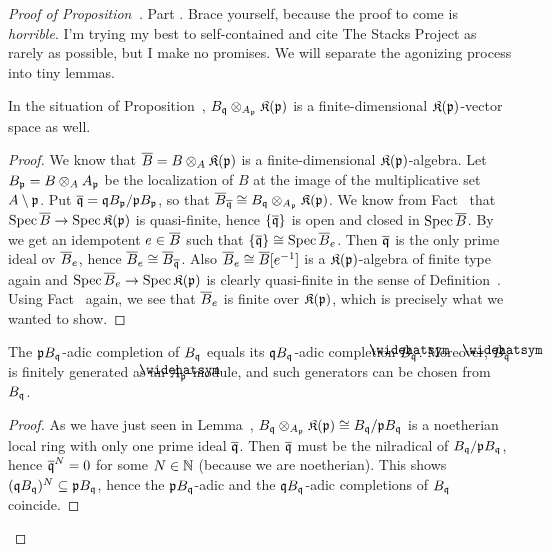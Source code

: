 \documentclass[a4paper,parskip=half,numbers=enddot, DIV=12]{scrreprt}
\begin{document}
\begin{proof}[Proof of Proposition~]
	Part . Brace yourself, because the proof to come is \emph{horrible}. I'm trying my best to self-contained and cite The Stacks Project as rarely as possible, but I make no promises. We will separate the agonizing process into tiny lemmas.
	\begin{lem}
		In the situation of Proposition~, $B_{\mathfrak{q}}\otimes_{A_{\mathfrak{p}}}\mathfrak{K}(\mathfrak{p})$ is a finite-dimensional $\mathfrak{K}(\mathfrak{p})$-vector space as well.
	\end{lem}
	\begin{proof}
		We know that $\overline{B}=B\otimes_A\mathfrak{K}(\mathfrak{p})$ is a finite-dimensional $\mathfrak{K}(\mathfrak{p})$-algebra. Let $B_{\mathfrak{p}}=B\otimes_AA_{\mathfrak{p}}$ be the localization of $B$ at the image of the multiplicative set $A\setminus \mathfrak{p}$. Put $\overline{\mathfrak{q}}=\mathfrak{q} B_{\mathfrak{p}}/\mathfrak{p} B_{\mathfrak{p}}$, so that $\overline{B}_{\overline{\mathfrak{q}}}\cong B_{\mathfrak{q}}\otimes_{A_{\mathfrak{p}}}\mathfrak{K}(\mathfrak{p})$. We know from Fact~ that $\Spec\ov{B}\morphism\Spec \KK(\pp)$ is quasi-finite, hence $\left\{\overline{\mathfrak{q}}\right\}$ is open and closed in $\operatorname{Spec}\overline{B}$. By \cite[]{stacks-project} we get an idempotent $e\in \overline{B}$ such that $\left\{\overline{\mathfrak{q}}\right\}\cong \operatorname{Spec} \overline{B}_e$. Then $\overline{\mathfrak{q}}$ is the only prime ideal ov $\overline{B}_e$, hence $\overline{B}_e\cong \overline{B}_{\overline{\mathfrak{q}}}$. Also $\overline{B}_e\cong \overline{B}[e^{-1}]$ is a $\mathfrak{K}(\mathfrak{p})$-algebra of finite type again and $\Spec \ov{B}_e\morphism \Spec \KK(\pp)$ is clearly quasi-finite in the sense of Definition~. Using Fact~ again, we see that $\overline{B}_e$ is finite over $\mathfrak{K}(\mathfrak{p})$, which is precisely what we wanted to show.
	\end{proof}
	\begin{lem}
		The $\mathfrak{p} B_{\mathfrak{q}}$-adic completion of $B_{\mathfrak{q}}$ equals its $\mathfrak{q} B_{\mathfrak{q}}$-adic completion $\roof{B}_\qq$. Moreover, $\roof{B}_\qq$ is finitely generated as an $\roof{A}_\pp$-module, and such generators can be chosen from $B_{\mathfrak{q}}$.
	\end{lem}
	\begin{proof}
		As we have just seen in Lemma~, $B_{\mathfrak{q}}\otimes_{A_{\mathfrak{p}}}\mathfrak{K}(\mathfrak{p})\cong B_{\mathfrak{q}}/\mathfrak{p} B_{\mathfrak{q}}$ is a noetherian local ring with only one prime ideal $\overline{\mathfrak{q}}$. Then $\overline{\mathfrak{q}}$ must be the nilradical of $B_{\mathfrak{q}}/\mathfrak{p} B_{\mathfrak{q}}$, hence $\overline{\mathfrak{q}}^N=0$ for some $N\in\mathbb{N}$ (because we are noetherian). This shows $(\mathfrak{q} B_{\mathfrak{q}})^N\subseteq \mathfrak{p} B_{\mathfrak{q}}$, hence the $\mathfrak{p} B_{\mathfrak{q}}$-adic and the $\mathfrak{q} B_{\mathfrak{q}}$-adic completions of $B_{\mathfrak{q}}$ coincide.
		

\end{proof}
\end{proof}
\end{document}
